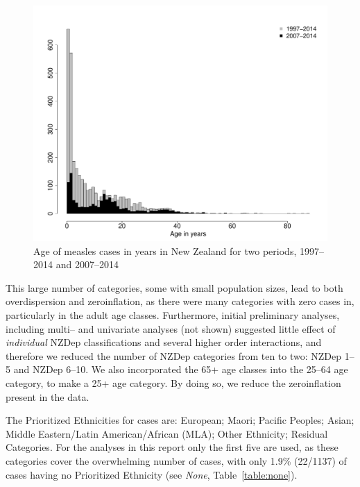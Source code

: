 \documentclass{article}
\begin{document}
\begin{figure}
\begin{center}
\includegraphics{draftfinalreport-002}
\end{center}
\caption{Age of measles cases in years in New Zealand for two periods, 1997--2014 and 2007--2014}
\label{fig:ageinyears}
\end{figure}





This large number of categories, some with small population sizes, lead to both overdispersion and zeroinflation, as there were many categories with zero cases in, particularly in the adult age classes. Furthermore, initial preliminary analyses, including multi-- and univariate analyses (not shown) suggested little effect of \textit{individual} NZDep classifications and several higher order interactions, and therefore we reduced the number of NZDep categories from ten to two: NZDep 1--5 and NZDep 6--10. We also incorporated the 65+ age classes into the 25--64 age category, to make a 25+ age category. By doing so, we reduce the zeroinflation present in the data. 

The Prioritized Ethnicities for cases are:  European; Maori; Pacific Peoples; Asian; Middle Eastern/Latin American/African (MLA); Other Ethnicity; Residual Categories. For the analyses in this report only the first five are used, as these categories cover the overwhelming number of cases, with only 1.9\% (22/1137) of cases having no Prioritized Ethnicity (see \emph{None}, Table~\ref{table:none}). 
\end{document}
